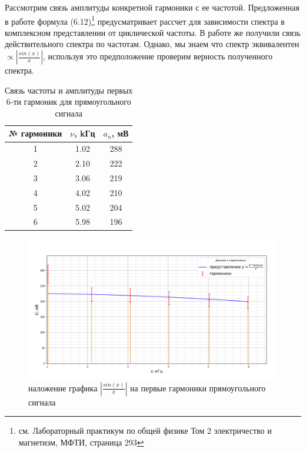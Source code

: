 \documentclass[a4paper, 12pt]{article}%
\begin{document}
	Рассмотрим связь амплитуды конкретной гармоники с ее частотой. Предложенная в работе формула (6.12)\footnote{см. Лабораторный практикум по общей физике Том 2 электричество и магнетизм, МФТИ, страница 293} предусматривает рассчет для зависимости спектра в комплексном представлении от циклической частоты. В работе же получили связь действительного спектра по частотам. Однако, мы знаем что спектр эквивалентен $ \propto |\frac{sin(x)}{x}| $, используя это предположение проверим верность полученного спектра.
	\begin{table}[H]
		\centering
		\begin{tabular}{|c|c|c|}
			\hline
			\multicolumn{1}{|l|}{№ гармоники} & \multicolumn{1}{l|}{$\nu$, kГц} & \multicolumn{1}{l|}{$a_n$, мВ} \\ \hline
			1                           & 1.02                        & 288                          \\ \hline
			2                           & 2.10                        & 222                          \\ \hline
			3                           & 3.06                        & 219                          \\ \hline
			4                           & 4.02                        & 210                          \\ \hline
			5                           & 5.02                        & 204                          \\ \hline
			6                           & 5.98                        & 196      \\ \hline                   
		\end{tabular}
		\caption{Связь частоты и амплитуды первых 6-ти гармоник для прямоугольного сигнала}
	\end{table}
	\begin{figure}[H]
		\centering
		\includegraphics[width=0.9\linewidth]{прямоуг}
		\caption{наложение графика $|\frac{sin(x)}{x}|$ на первые гармоники прямоугольного сигнала}
		\label{fig:}
	\end{figure}
\end{document}
